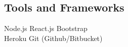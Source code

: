 \documentclass[]{deedy-resume-openfont}
\begin{document}
\begin{minipage}[t]{0.33\textwidth}
\subsection{Tools and Frameworks}
Node.js \textbullet{}   React.js \textbullet{} 
Bootstrap \textbullet{} \\
Heroku \textbullet{} 
Git (Github/Bitbucket) 

\sectionsep





%
%

\end{minipage} 
\end{document}
